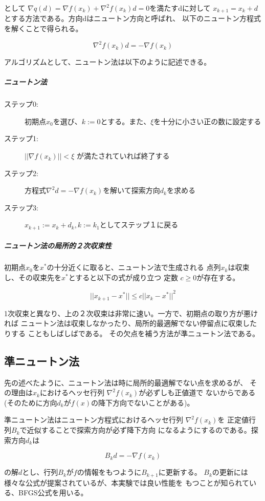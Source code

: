 \documentclass{jsarticle}
\begin{document}
として $\nabla q(d) = \nabla f(x_k) + {\nabla}^2 f(x_k)d = 0$を満たすdに対して
$x_{k+1} = x_k + d$とする方法である。方向dはニュートン方向と呼ばれ、
以下のニュートン方程式を解くことで得られる。

$$
{\nabla}^2 f(x_k)d = - \nabla f(x_k)
$$

アルゴリズムとして、ニュートン法は以下のように記述できる。

\subparagraph{ニュートン法}
\begin{description}
  \item[ステップ0:] 初期点$x_0$を選び、$k := 0$とする。また、$\xi$を十分に小さい正の数に設定する
  \item[ステップ1:] $||\nabla f(x_k)|| < \xi$ が満たされていれば終了する
  \item[ステップ2:] 方程式${\nabla}^2d = -\nabla f(x_k)$を解いて探索方向$d_k$を求める
  \item[ステップ3:] $x_{k+1} := x_k + d_k, k := k _ 1$としてステップ１に戻る
\end{description}

\subparagraph{ニュートン法の局所的２次収束性}
初期点$x_0$を$x^{\ast}$の十分近くに取ると、ニュートン法で生成される
点列${x_k}$は収束し、その収束先を$x^{\ast}$とすると以下の式が成り立つ
定数 $c \geq 0$が存在する。

$$
||x_{k+1} - x^{\ast}|| \leq c {||x_k - x^{\ast}||}^2
$$

1次収束と異なり、上の２次収束は非常に速い。一方で、初期点の取り方が悪ければ
ニュートン法は収束しなかったり、局所的最適解でない停留点に収束したりする
こともしばしばである。
その欠点を補う方法が準ニュートン法である。

\subsection{準ニュートン法}
先の述べたように、ニュートン法は時に局所的最適解でない点を求めるが、
その理由は$x_k$におけるヘッセ行列 ${\nabla}^2 f(x_k)$が必ずしも正値道で
ないからである(そのために方向$d_k$が$f(x)$の降下方向でないことがある)。

準ニュートン法はニュートン方程式におけるヘッセ行列 ${\nabla}^2f(x_k)$を
正定値行列$B_k$で近似することで探索方向が必ず降下方向
になるようにするのである。探索方向$d_k$は

$$
B_kd = - \nabla f(x_k)
$$

の解$d$とし、行列$B_k$が$f$の情報をもつように$B_{k+1}$に更新する。
$B_k$の更新には様々な公式が提案されているが、本実験では良い性能を
もつことが知られている、BFGS公式を用いる。
\end{document}
